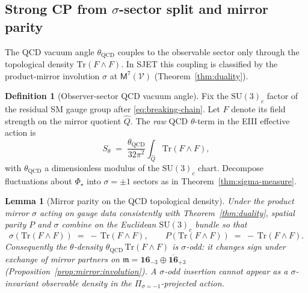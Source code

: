 \documentclass[aps,prd,onecolumn,amsmath,amssymb,nofootinbib,11pt]{revtex4-2}
\numberwithin{equation}{section}
\theoremstyle{plain}
\newtheorem{lemma}[theorem]{Lemma}
\theoremstyle{definition}
\newtheorem{definition}[theorem]{Definition}
\theoremstyle{remark}
\newcommand{\Void}{\mathcal{V}}
\newcommand{\Mirror}{\mathsf{M}}
\newcommand{\orderparam}{\Phi}
\begin{document}
\subsection{Strong CP from $\sigma$-sector split and mirror parity}
\label{sec:baryogenesis:strong-cp}

The QCD vacuum angle $\theta_{\mathrm{QCD}}$ couples to the observable sector
only through the topological density $\mathrm{Tr}(F\wedge F)$. In SJET this
coupling is classified by the product-mirror involution $\sigma$ at
$\Mirror^7(\Void)$ (Theorem~\ref{thm:duality}).

\begin{definition}[Observer-sector QCD vacuum angle]\label{def:theta-qcd}
Fix the $\mathrm{SU}(3)_c$ factor of the residual SM gauge group after
\eqref{eq:breaking-chain}. Let $F$ denote its field strength on the mirror
quotient $\hat Q$. The \emph{raw} QCD $\theta$-term in the EIII effective
action is
\begin{equation}\label{eq:theta-raw}
  S_\theta
  \;=\;
  \frac{\theta_{\mathrm{QCD}}}{32\pi^2}
  \int_{\hat Q}
  \mathrm{Tr}(F\wedge F),
\end{equation}
with $\theta_{\mathrm{QCD}}$ a dimensionless modulus of the
$\mathrm{SU}(3)_c$ chart. Decompose fluctuations about $\orderparam_\star$
into $\sigma=\pm1$ sectors as in Theorem~\ref{thm:sigma-measure}.
\end{definition}

\begin{lemma}[Mirror parity on the QCD topological density]
\label{lem:theta-parity}
Under the product mirror $\sigma$ acting on gauge data consistently with
Theorem~\ref{thm:duality}, spatial parity $P$ and $\sigma$ combine on the
Euclidean $\mathrm{SU}(3)_c$ bundle so that
\begin{equation}\label{eq:theta-sigma-odd}
  \sigma\!\left(\mathrm{Tr}(F\wedge F)\right)
  \;=\;
  -\,\mathrm{Tr}(F\wedge F),
  \qquad
  P\!\left(\mathrm{Tr}(F\wedge F)\right)
  \;=\;
  -\,\mathrm{Tr}(F\wedge F).
\end{equation}
Consequently the $\theta$-density $\theta_{\mathrm{QCD}}\,
\mathrm{Tr}(F\wedge F)$ is $\sigma$-odd: it changes sign under exchange of
mirror partners on $\mathfrak{m}=\mathbf{16}_{-3}\oplus\overline{\mathbf{16}}_{+3}$
(Proposition~\ref{prop:mirror:involution}). A $\sigma$-odd insertion cannot
appear as a $\sigma$-invariant observable density in the
$\Pi_{\sigma=-1}$-projected action.
\end{lemma}
\end{document}
